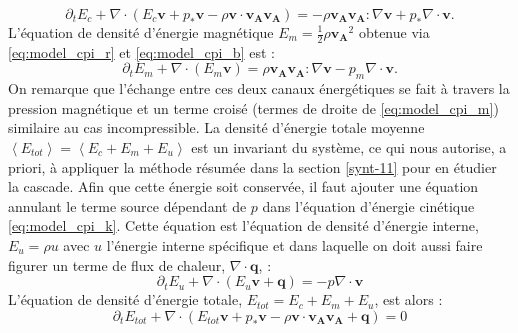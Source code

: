 \begin{equation}
 \label{eq:model_cpi_k}   \partial_t E_c +\nabla \cdot \left(E_c \boldsymbol{v} + p_* \boldsymbol{v}- \rho \boldsymbol{v} \cdot \boldsymbol{v_A}\boldsymbol{v_A}\right)   = -  \rho \boldsymbol{v_A}  \boldsymbol{v_A} : \nabla \boldsymbol{v} + p_* \nabla \cdot \boldsymbol{v}.
\end{equation}
L'équation de densité d'énergie magnétique $E_m = \frac{1}{2}\rho \boldsymbol{v_A}^2$ obtenue via \eqref{eq:model_cpi_r} et \eqref{eq:model_cpi_b} est :
\begin{equation}
  \label{eq:model_cpi_m}   \partial_t E_m  +\nabla   \cdot  \left(E_m\boldsymbol{v}\right)  = \rho  \boldsymbol{v_A}\boldsymbol{v_A}  : \nabla \boldsymbol{v}- p_m  \nabla \cdot \boldsymbol{v}.
\end{equation}
On remarque que l'échange entre ces deux canaux énergétiques se fait à travers la pression magnétique et un terme croisé (termes de droite de \eqref{eq:model_cpi_m}) similaire au cas incompressible. La densité d'énergie totale moyenne $\left<E_{tot}\right> = \left< E_c + E_m + E_u\right>$ est un invariant du système, ce qui nous autorise, a priori, à appliquer la méthode résumée dans la section \ref{synt-11} pour en étudier la cascade. Afin que cette énergie soit conservée, il faut ajouter une équation annulant le terme source dépendant de $p$ dans l'équation d'énergie cinétique \eqref{eq:model_cpi_k}. Cette équation est l'équation de densité d'énergie interne, $E_u = \rho u$ avec $u$ l'énergie interne spécifique et dans laquelle on doit aussi faire figurer un terme de flux de chaleur, $\nabla \cdot \boldsymbol{q}$, :
\begin{equation}
   \label{eq:model_cpi_u}  \partial_t E_u +\nabla \cdot \left(E_u \boldsymbol{v} + \boldsymbol{q}\right)   = - p \nabla \cdot \boldsymbol{v}
\end{equation}
L'équation de densité d'énergie totale, $E_{tot} = E_c + E_m + E_u$, est alors : 
\begin{equation}
   \label{eq:model_cpi_e}  \partial_t E_{tot} +\nabla \cdot \left(E_{tot} \boldsymbol{v} + p_* \boldsymbol{v}- \rho \boldsymbol{v} \cdot \boldsymbol{v_A}\boldsymbol{v_A} + \boldsymbol{q}\right)   = 0
\end{equation}
